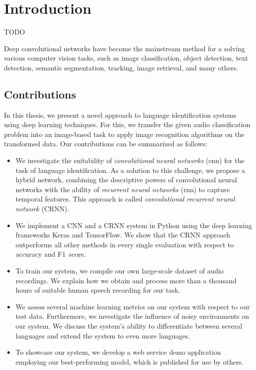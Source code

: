 \section{Introduction}


TODO

Deep convolutional networks have become the mainstream method for a solving various computer vision tasks, such as image classification\cite{russakovsky2015imagenet}, object detection\cite{russakovsky2015imagenet, everingham2010pascal}, text detection\cite{Yang2016SceneTextRegAR, jaderberg2014synthetic}, semantic segmentation\cite{dai2016instance, girshick2014rich}, tracking\cite{nam2016learning}, image retrieval\cite{tolias2015particular}, and many others.

\subsection{Contributions}
In this thesis, we present a novel approach to language identification systems using deep learning techniques. For this, we transfer the given audio classification problem into an image-based task to apply image recognition algorithms on the transformed data. Our contributions can be summarized as follows:
\begin{itemize}
	\item We investigate the suitability of \emph{convolutional neural networks} (\ac{cnn}) for the task of language identification. As a solution to this challenge, we propose a hybrid network, combining the descriptive powers of convolutional neural networks with the ability of \emph{recurrent neural networks} (\ac{rnn}) to capture temporal features. This approach is called \emph{convolutional recurrent neural network} (CRNN).
	\item We implement a CNN and a CRNN system in Python using the deep learning frameworks Keras and TensorFlow. We show that the CRNN approach outperforms all other methods in every single evaluation with respect to accuracy and F1~score.
	\item To train our system, we compile our own large-scale dataset of audio recordings. We explain how we obtain and process more than a thousand hours of suitable human speech recording for our task.
	\item We assess several machine learning metrics on our system with respect to our test data. Furthermore, we investigate the influence of noisy environments on our system. We discuss the system's ability to differentiate between several languages and extend the system to even more languages.
	\item To showcase our system, we develop a web service demo application employing our best-performing model, which is published for use by others.
\end{itemize}



